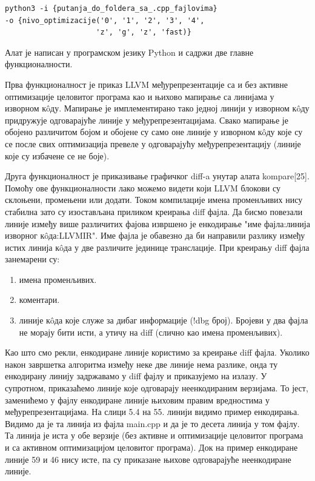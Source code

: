 \documentclass[12pt,oneside]{memoir}
\begin{document}
\begin{lstlisting}[frame=single]
python3 -i {putanja_do_foldera_sa_.cpp_fajlovima}
-o {nivo_optimizacije('0', '1', '2', '3', '4',
                     'z', 'g', 'z', 'fast)}

\end{lstlisting}

Алат је написан у програмском језику Python и садржи две главне функционалности.

Прва функционалност је приказ LLVM међурепрезентације са и без активне оптимизације
целовитог програма као и њихово мапирање са линијама у изворном к\^{o}ду.
Мапирање је имплементирано тако  једној линији у изворном к\^{o}ду придружује
одговарајуће линије у међурепрезентацијама.
Свако мапирање је обојено различитом бојом и обојене су само оне линије у изворном
к\^{o}ду које су се после свих оптимизација превеле у одговарајућу међурепрезентацију
 (линије које су избачене се не боје).
 
Друга функционалност је приказивање графичког diff-a унутар алата kompare[25].
Помоћу ове функционалности лако можемо видети који LLVM блокови су склоњени, 
промењени или додати.
Током компилације имена променљивих нису стабилна зато су изостављана приликом
креирања diff фајла.
Да бисмо повезали линије између више различитих фајова извршено је енкодирање "име фајла:линија изворног  к\^{o}да:LLVMIR".
Име фајла је обавезно да би направили разлику између истих линија  к\^{o}да у две различите јединице транслације.
При креирању diff фајла занемарени су:
\begin{enumerate}
\item имена променљивих.
\item коментари.
\item линије к\^{o}да које служе за дибаг информације (!dbg број). Бројеви у два
	фајла не морају бити исти, а утичу на diff (слично као имена променљивих).
\end{enumerate}
Као што смо рекли, енкодиране линије користимо за креирање diff фајла.
Уколико након завршетка алгоритма између неке две линије нема разлике, онда ту
енкодирану линију задржавамо у diff фајлу и приказујемо на излазу.
У супротном, приказаћемо линије које одговарају неенкодираним верзијама.
То јест, заменићемо у фајлу енкодиране линије њиховим правим вредностима у међурепрезентацијама.
На слици 5.4 на 55. линији видимо пример енкодирања. 
Видимо да је та линија из фајла main.cpp и да је то десета линија у том фајлу.
Та линија је иста у обе верзије (без активне и оптимизације целовитог програма
и са активном оптимизацијом целовитог програма).
Док на пример енкодиране линије 59 и 46 нису исте, па су приказане њихове
 одговарајуће неенкодиране линије. 
\end{document}
